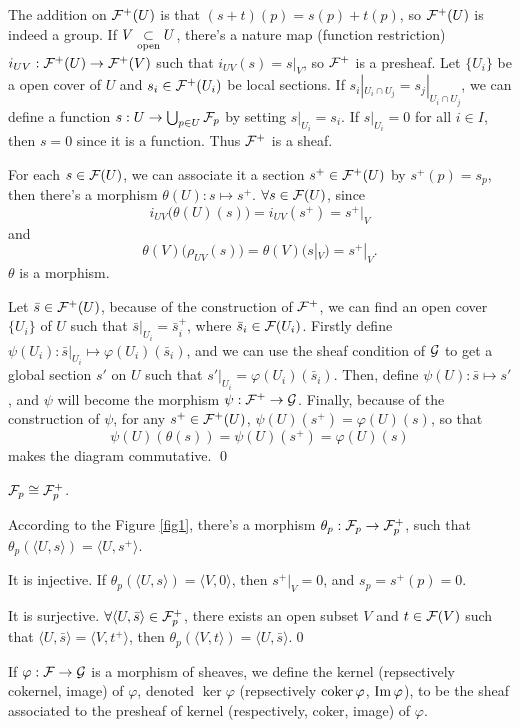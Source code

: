 \documentclass[10pt]{extbook}
\begin{document}
	The addition on $\mathcal{F}^+(U)$ is that $(s+t)(p)=s(p)+t(p)$, so $\mathcal{F}^+(U)$ is indeed a 
	group. If $V\underset{\mathrm{open}}{\subset} U$, there's a nature map (function restriction) 
	$i_{UV}:\mathcal{F}^+(U)\to \mathcal{F}^+(V)$ such that $i_{UV}(s)=s|_V$, so $\mathcal{F}^+$ is a presheaf. 
	Let $\{U_i\}$ be a open cover of $U$ and $s_i\in \mathcal{F}^+(U_i)$ be local sections. 
	If $s_i|_{U_i\cap U_j}=s_j|_{U_i\cap U_j}$, we can define a function 
	$s:U\to \bigcup_{p\in U}\mathcal{F}_p$ by setting $s|_{U_i}=s_i$. If $s|_{U_i}=0$ for all 
	$i\in I$, then $s=0$ since it is a function. Thus $\mathcal{F}^+$ is a sheaf.

	For each $s\in \mathcal{F}(U)$, we can associate it a section $s^+\in \mathcal{F}^+(U)$ by 
	$s^+(p)=s_p$, then there's a morphism 
	$\theta(U):s\mapsto s^+$. $\forall s\in \mathcal{F}(U)$, since
	\[
		i_{UV}\bigl(\theta(U)(s)\bigr)=i_{UV}(s^+)=s^+|_{V}
	\]
	and
	\[
		\theta(V)\bigl(\rho_{UV}(s)\bigr)=\theta(V)(s|_V)=s^+|_{V}.
	\]
	$\theta$ is a morphism.

	Let $\bar{s}\in \mathcal{F}^+(U)$, because of the construction of $\mathcal{F}^+$, we can find an 
	open cover $\{U_i\}$ of $U$ such that $\bar{s}|_{U_i}=\bar{s}^+_i$, where
	$\bar{s}_i\in \mathcal{F}(U_i)$. Firstly define 
	$\psi(U_i):\bar{s}|_{U_i}\mapsto \varphi(U_i)(\bar{s}_i)$, and we can use the sheaf 
	condition of $\mathcal{G}$ to get a global section $s'$ on $U$ such that 
	$s'|_{U_i}=\varphi(U_i)(\bar{s}_i)$. Then, define $\psi(U):\bar{s}\mapsto s'$, and 
	$\psi$ will become the morphism $\psi:\mathcal{F}^+\to \mathcal{G}$. Finally, because of the 
	construction of $\psi$, for any $s^+\in \mathcal{F}^+(U)$, $\psi(U)(s^+)=\varphi(U)(s)$, so 
	that
	\[
		\psi(U)(\theta(s))=\psi(U)(s^+)=\varphi(U)(s)
	\]
	makes the diagram commutative. \qed

\pro \label{pro:4} $\mathcal{F}_p\cong \mathcal{F}^+_p$.

\proof According to the Figure \ref{fig1}, there's a morphism 
$\theta_p:\mathcal{F}_p\to \mathcal{F}^+_p$, such that 
$\theta_p(\langle U,s\rangle)=\langle U,s^+\rangle$.

It is injective. If $\theta_p(\langle U,s\rangle)=\langle V,0\rangle$, then $s^+|_V=0$,
and $s_p=s^+(p)=0$.

It is surjective. $\forall \langle U,\bar{s}\rangle\in \mathcal{F}^+_p$, there exists an open 
subset $V$ and $t\in \mathcal{F}(V)$ such that $\langle U,\bar{s}\rangle=\langle V,t^+\rangle$, 
then $\theta_p(\langle V,t\rangle)=\langle U,\bar{s}\rangle$.\qed

\para If $\varphi:\mathcal{F}\to\mathcal{G}$ is a morphism of sheaves, we define the kernel 
(repsectively cokernel, image) of $\varphi$, denoted $\ker \varphi$ (repsectively 
$\operatorname{coker} \varphi$, $\operatorname{Im} \varphi$), to be the sheaf associated to the presheaf of kernel 
(respectively, coker, image) of $\varphi$.
\end{document}
